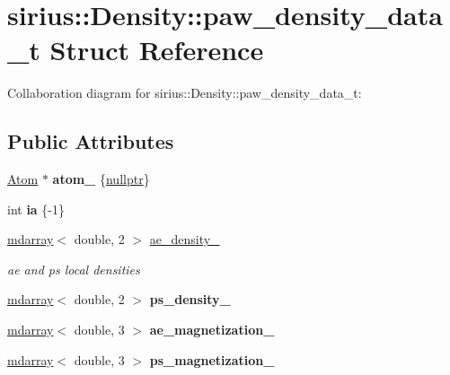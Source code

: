 \hypertarget{structsirius_1_1_density_1_1paw__density__data__t}{}\section{sirius\+:\+:Density\+:\+:paw\+\_\+density\+\_\+data\+\_\+t Struct Reference}
\label{structsirius_1_1_density_1_1paw__density__data__t}


Collaboration diagram for sirius\+:\+:Density\+:\+:paw\+\_\+density\+\_\+data\+\_\+t\+:
\subsection*{Public Attributes}
\begin{DoxyCompactItemize}
\item 
\hypertarget{structsirius_1_1_density_1_1paw__density__data__t_a79a48642e290df37a8fe359c4c72d625}{}\hyperlink{classsirius_1_1_atom}{Atom} $\ast$ {\bfseries atom\+\_\+} \{\hyperlink{classsirius_1_1_density_af12e5c3f7ce7767fa506e0bbd169ade3}{nullptr}\}\label{structsirius_1_1_density_1_1paw__density__data__t_a79a48642e290df37a8fe359c4c72d625}

\item 
\hypertarget{structsirius_1_1_density_1_1paw__density__data__t_af3bff421d1cdf60938f212aea461cfab}{}int {\bfseries ia} \{-\/1\}\label{structsirius_1_1_density_1_1paw__density__data__t_af3bff421d1cdf60938f212aea461cfab}

\item 
\hyperlink{classsddk_1_1mdarray}{mdarray}$<$ double, 2 $>$ \hyperlink{structsirius_1_1_density_1_1paw__density__data__t_a647c03d527b97d38f5167f7180ed7438}{ae\+\_\+density\+\_\+}
\begin{DoxyCompactList}\small\item\em ae and ps local densities \end{DoxyCompactList}\item 
\hypertarget{structsirius_1_1_density_1_1paw__density__data__t_a55b6fb8256a664ca02baeaac3255e5df}{}\hyperlink{classsddk_1_1mdarray}{mdarray}$<$ double, 2 $>$ {\bfseries ps\+\_\+density\+\_\+}\label{structsirius_1_1_density_1_1paw__density__data__t_a55b6fb8256a664ca02baeaac3255e5df}

\item 
\hypertarget{structsirius_1_1_density_1_1paw__density__data__t_a2334ab1d1a2368ae010e1f1654e25de2}{}\hyperlink{classsddk_1_1mdarray}{mdarray}$<$ double, 3 $>$ {\bfseries ae\+\_\+magnetization\+\_\+}\label{structsirius_1_1_density_1_1paw__density__data__t_a2334ab1d1a2368ae010e1f1654e25de2}

\item 
\hypertarget{structsirius_1_1_density_1_1paw__density__data__t_acbb6e97c73b7117ee74ef9ed76aa151f}{}\hyperlink{classsddk_1_1mdarray}{mdarray}$<$ double, 3 $>$ {\bfseries ps\+\_\+magnetization\+\_\+}\label{structsirius_1_1_density_1_1paw__density__data__t_acbb6e97c73b7117ee74ef9ed76aa151f}

\end{DoxyCompactItemize}


